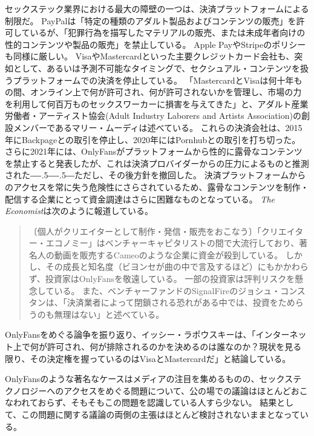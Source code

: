 \documentclass[paper=a4,book,openany]{jlreq}
\newcommand{\ig}[1]{}           %
\def\DDASH{―\kern-.5\zw―\kern-.5\zw―} %
\begin{document}
セックステック業界における最大の障壁の一つは、決済プラットフォームによる制限だ。
PayPalは「特定の種類のアダルト製品およびコンテンツの販売」を許可しているが、「犯罪行為を描写したマテリアルの販売、または未成年者向けの性的コンテンツや製品の販売」を禁止している\citep{fearnow20:_porn_indus_stars_turn_crypt}。
Apple PayやStripeのポリシーも同様に厳しい。
VisaやMastercardといった主要クレジットカード会社も、突如として、あるいは予測不可能なタイミングで、セクシュアル・コンテンツを扱うプラットフォームでの決済を停止している。
「MastercardとVisaは何十年もの間、オンライン上で何が許可され、何が許可されないかを管理し、市場の力を利用して何百万ものセックスワーカーに損害を与えてきた」と、アダルト産業労働者・アーティスト協会(Adult Industry Laborers and Artists Association)の創設メンバーであるマリー・ムーディ\ig{Mary Moody}は述べている\citep{cole21:_i_felt_betray}。
これらの決済会社は、2015年にBackpageとの取引を停止し、2020年にはPornhubとの取引を打ち切った。
さらに2021年には、OnlyFansがプラットフォームから性的に露骨なコンテンツを禁止すると発表したが、これは決済プロバイダーからの圧力によるものと推測された{\DDASH}ただし、その後方針を撤回した。
決済プラットフォームからのアクセスを常に失う危険性にさらされているため、露骨なコンテンツを制作・配信する企業にとって資金調達はさらに困難なものとなっている\citep{sesta18:_platf_which_discr_sex_worker}。
\emph{The Economist}は次のように報道している。

\begin{quote}
〔個人がクリエイターとして制作・発信・販売をおこなう〕「クリエイター・エコノミー」はベンチャーキャピタリストの間で大流行しており、著名人の動画を販売するCameoのような企業に資金が殺到している。
しかし、その成長と知名度（ビヨンセが曲の中で言及するほど）にもかかわらず、投資家はOnlyFansを敬遠している。
一部の投資家は評判リスクを懸念している。
また、ベンチャーファンドのSignalFireのジョシュ・コンスタンは、「決済業者によって閉鎖される恐れがある中では、投資をためらうのも無理はない」と述べている。
\citep{economist21:_onlyf_u_turns_its_porn_ban}
\end{quote}

OnlyFansをめぐる論争を振り返り、イッシー・ラポウスキー\ig{Issue Lapowsky}は、「インターネット上で何が許可され、何が排除されるのかを決めるのは誰なのか？現状を見る限り、その決定権を握っているのはVisaとMastercardだ」と結論している\citep{lapowsky21:_onlyf_shows_visa_master_are}。

OnlyFansのような著名なケースはメディアの注目を集めるものの、セックステクノロジーへのアクセスをめぐる問題について、公の場での議論はほとんどおこなわれておらず、そもそもこの問題を認識している人すら少ない。
結果として、この問題に関する議論の両側の主張はほとんど検討されないままとなっている。
\end{document}
